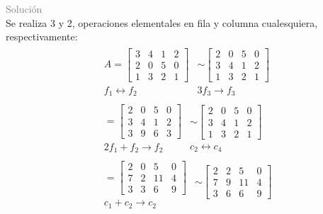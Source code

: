 \textcolor{gray}{Solución }\\
Se realiza 3 y 2, operaciones elementales en fila y columna cualesquiera, respectivamente:
	\begin{align*}
		&\begin{array} {c}
			A=\begin{bmatrix}
				3&4&1&2\\
				2&0&5&0\\
				1&3&2&1
			\end{bmatrix} \\
			f_1\leftrightarrow f_2
		\end{array}
		\begin{array} {c}
			\sim\begin{bmatrix}
				2&0&5&0\\
				3&4&1&2\\
				1&3&2&1
			\end{bmatrix} \\
			3f_3\rightarrow f_3
		\end{array} \\
		&\begin{array} {c}
			=\begin{bmatrix}
				2&0&5&0\\
				3&4&1&2\\
				3&9&6&3
			\end{bmatrix} \\
			2f_1+f_2\rightarrow f_2
		\end{array}
		\begin{array} {c}
			\sim\begin{bmatrix}
				2&0&5&0\\
				3&4&1&2\\
				1&3&2&1
			\end{bmatrix} \\
			c_2\leftrightarrow c_4
		\end{array} \\
		&\begin{array} {c}
			=\begin{bmatrix}
				2&0&5&0\\
				7&2&11&4\\
				3&3&6&9
			\end{bmatrix} \\
			c_1+c_2\rightarrow c_2
		\end{array}
		\begin{array} {c}
			\sim\begin{bmatrix}
				2&2&5&0\\
				7&9&11&4\\
				3&6&6&9
			\end{bmatrix} \\
			\
		\end{array}
	\end{align*}
